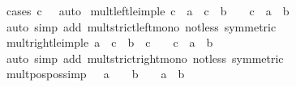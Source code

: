 \begin{isabellebody}
\ {\isacharparenleft}{\kern0pt}cases\ {\isachardoublequoteopen}c\ {\isacharequal}{\kern0pt}\ {}{\isachardoublequoteclose}{\isacharparenright}{\kern0pt}\ auto\isanewline
{}\isamarkupfalse%
%
\endisatagproof
{\isafoldproof}%
%
\isadelimproof
\isanewline
%
\endisadelimproof
\isanewline
{}\isamarkupfalse%
\ mult{\isacharunderscore}{\kern0pt}left{\isacharunderscore}{\kern0pt}le{\isacharunderscore}{\kern0pt}imp{\isacharunderscore}{\kern0pt}le{\isacharcolon}{\kern0pt}\ {\isachardoublequoteopen}c\ {\isacharasterisk}{\kern0pt}\ a\ {\isasymle}\ c\ {\isacharasterisk}{\kern0pt}\ b\ {\isasymLongrightarrow}\ {}\ {\isacharless}{\kern0pt}\ c\ {\isasymLongrightarrow}\ a\ {\isasymle}\ b{\isachardoublequoteclose}\isanewline
%
\isadelimproof
\ \ %
\endisadelimproof
%
\isatagproof
{}\isamarkupfalse%
\ {\isacharparenleft}{\kern0pt}auto\ simp\ add{\isacharcolon}{\kern0pt}\ mult{\isacharunderscore}{\kern0pt}strict{\isacharunderscore}{\kern0pt}left{\isacharunderscore}{\kern0pt}mono\ {\isacharunderscore}{\kern0pt}not{\isacharunderscore}{\kern0pt}less\ {\isacharbrackleft}{\kern0pt}symmetric{\isacharbrackright}{\kern0pt}{\isacharparenright}{\kern0pt}%
\endisatagproof
{\isafoldproof}%
%
\isadelimproof
\isanewline
%
\endisadelimproof
\isanewline
{}\isamarkupfalse%
\ mult{\isacharunderscore}{\kern0pt}right{\isacharunderscore}{\kern0pt}le{\isacharunderscore}{\kern0pt}imp{\isacharunderscore}{\kern0pt}le{\isacharcolon}{\kern0pt}\ {\isachardoublequoteopen}a\ {\isacharasterisk}{\kern0pt}\ c\ {\isasymle}\ b\ {\isacharasterisk}{\kern0pt}\ c\ {\isasymLongrightarrow}\ {}\ {\isacharless}{\kern0pt}\ c\ {\isasymLongrightarrow}\ a\ {\isasymle}\ b{\isachardoublequoteclose}\isanewline
%
\isadelimproof
\ \ %
\endisadelimproof
%
\isatagproof
{}\isamarkupfalse%
\ {\isacharparenleft}{\kern0pt}auto\ simp\ add{\isacharcolon}{\kern0pt}\ mult{\isacharunderscore}{\kern0pt}strict{\isacharunderscore}{\kern0pt}right{\isacharunderscore}{\kern0pt}mono\ not{\isacharunderscore}{\kern0pt}less\ {\isacharbrackleft}{\kern0pt}symmetric{\isacharbrackright}{\kern0pt}{\isacharparenright}{\kern0pt}%
\endisatagproof
{\isafoldproof}%
%
\isadelimproof
\isanewline
%
\endisadelimproof
\isanewline
{}\isamarkupfalse%
\ mult{\isacharunderscore}{\kern0pt}pos{\isacharunderscore}{\kern0pt}pos{\isacharbrackleft}{\kern0pt}simp{\isacharbrackright}{\kern0pt}{\isacharcolon}{\kern0pt}\ {\isachardoublequoteopen}{}\ {\isacharless}{\kern0pt}\ a\ {\isasymLongrightarrow}\ {}\ {\isacharless}{\kern0pt}\ b\ {\isasymLongrightarrow}\ {}\ {\isacharless}{\kern0pt}\ a\ {\isacharasterisk}{\kern0pt}\ b{\isachardoublequoteclose}\isanewline

\end{isabellebody}
